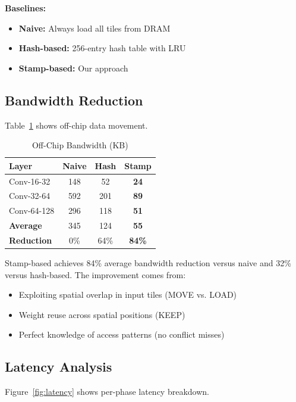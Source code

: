 \documentclass[conference]{IEEEtran}
\begin{document}
\textbf{Baselines:}
\begin{itemize}
\item \textbf{Naive:} Always load all tiles from DRAM
\item \textbf{Hash-based:} 256-entry hash table with LRU
\item \textbf{Stamp-based:} Our approach
\end{itemize}

\subsection{Bandwidth Reduction}

Table~\ref{tab:bandwidth} shows off-chip data movement.

\begin{table}[t]
\centering
\caption{Off-Chip Bandwidth (KB)}
\label{tab:bandwidth}
\begin{tabular}{lccc}
\toprule
\textbf{Layer} & \textbf{Naive} & \textbf{Hash} & \textbf{Stamp} \\
\midrule
Conv-16-32 & 148 & 52 & \textbf{24} \\
Conv-32-64 & 592 & 201 & \textbf{89} \\
Conv-64-128 & 296 & 118 & \textbf{51} \\
\midrule
\textbf{Average} & 345 & 124 & \textbf{55} \\
\textbf{Reduction} & 0\% & 64\% & \textbf{84\%} \\
\bottomrule
\end{tabular}
\end{table}

Stamp-based achieves 84\% average bandwidth reduction versus naive and 32\% versus hash-based. The improvement comes from:
\begin{itemize}
\item Exploiting spatial overlap in input tiles (MOVE vs. LOAD)
\item Weight reuse across spatial positions (KEEP)
\item Perfect knowledge of access patterns (no conflict misses)
\end{itemize}

\subsection{Latency Analysis}

Figure~\ref{fig:latency} shows per-phase latency breakdown.
\end{document}
